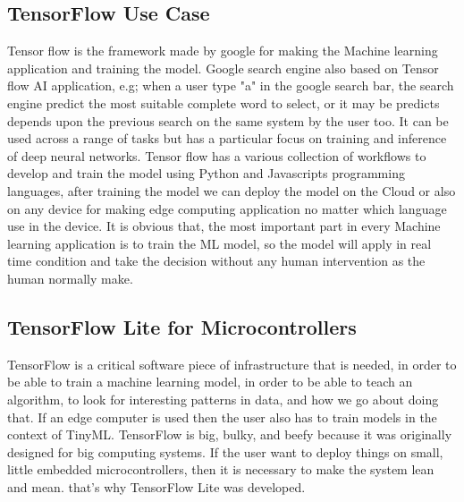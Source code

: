 \subsection{TensorFlow Use Case}

Tensor flow is the framework made by google for making the Machine learning application and training the model. Google search engine also based on Tensor flow AI application, e.g; when a user type "a" in the google search bar, the search engine predict the most suitable complete word to select, or it may be predicts depends upon the previous search on the same system by the user too. It can be used across a range of tasks but has a particular focus on training and inference of deep neural networks. Tensor flow has a various collection of workflows to develop and train the model using Python and Javascripts programming languages, after training the model we can deploy the model on the Cloud or also on any device for making edge computing application no matter which language use in the device. It is obvious that, the most important part in every Machine learning application is to train the ML model, so the model will apply in real time condition and take the decision without any human intervention as the human normally make. 

\subsection{TensorFlow Lite for Microcontrollers}

TensorFlow is a critical software piece of infrastructure that is needed, in order to be able to train a machine learning model, in order to be able to teach an algorithm, to look for interesting patterns in data, and how we go about doing that. If an edge computer is used then the user also has to train models in the context of TinyML. TensorFlow is big, bulky, and beefy because it was originally designed for big computing systems. If the user want to deploy  things on small, little embedded microcontrollers, then it is necessary to make the system lean and mean. that's why TensorFlow Lite was developed.

